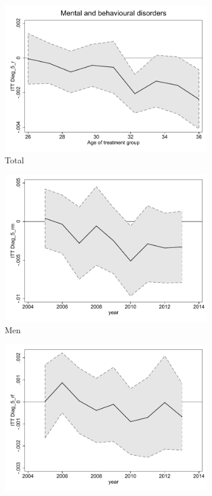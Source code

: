 \documentclass[a4paper ]{article}
\begin{document}
\begin{figure}[h!]
	\centering
	\begin{subfigure}[t]{0.31\textwidth}
		\centering
		\includegraphics[width=0.99\textwidth]{R1_LC_Diag_5_r}
		\caption{Total}		
	\end{subfigure}
	\begin{subfigure}[t]{0.31\textwidth}
		\centering
		\includegraphics[width=0.99\textwidth]{R1_LC_Diag_5_rm}
		\caption{Men}		
	\end{subfigure}
	\quad
	\begin{subfigure}[t]{0.31\textwidth}
		\centering
		\includegraphics[width=0.99\textwidth]{R1_LC_Diag_5_rf}

\end{subfigure}
\end{figure}
\end{document}
